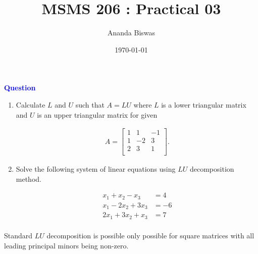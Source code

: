 \documentclass[11pt, a4paper]{article}\usepackage[]{graphicx}\usepackage[]{xcolor}
\title{MSMS 206 : Practical 03}
\author{Ananda Biswas}
\date{\today}
\begin{document}
\maketitle


 \hspace{0.2cm} \textcolor{blue}{\textbf{Question}}

\vspace{0.3cm}

\begin{enumerate}[(1)]

\item Calculate $L$ and $U$ such that $A = LU$ where $L$ is a lower triangular matrix and $U$ is an upper triangular matrix for given

\begin{gather*}
A = 
\begin{bmatrix}
1 & 1 & -1 \\
1 & -2 & 3 \\
2 & 3 & 1 \\
\end{bmatrix}.
\end{gather*}


\item Solve the following system of linear equations using $LU$ decomposition method.

\begin{align*}
x_1 + x_2 - x_3 &= 4 \\
x_1 - 2x_2 + 3x_3 &= -6 \\
2x_1 + 3x_2 + x_3 &= 7 \\
\end{align*}

\end{enumerate}


\faArrowAltCircleRight[regular] \hspace{0.2cm} Standard $LU$ decomposition is possible only possible for square matrices with all leading principal minors being non-zero.
\end{document}
